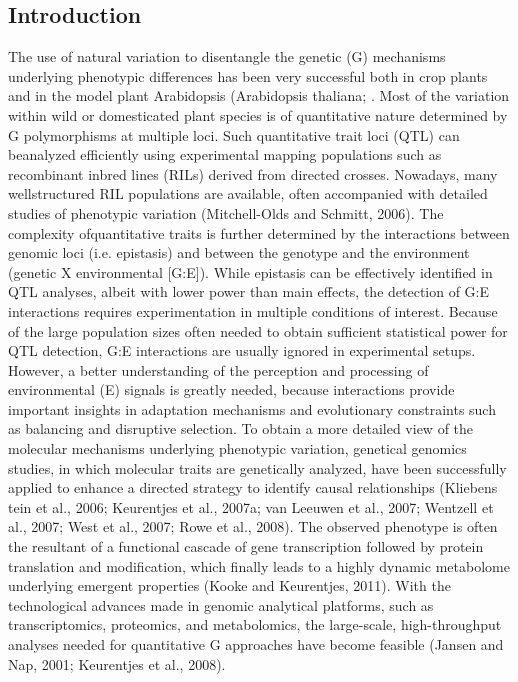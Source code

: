 \subsection{Introduction}
The use of natural variation to disentangle the genetic (G) mechanisms underlying phenotypic differences 
has been very successful both in crop plants and in the model plant Arabidopsis (Arabidopsis thaliana; 
\cite{Alonso-Blanco:2009}. Most of the variation within wild or domesticated plant species is of 
quantitative nature determined by G polymorphisms at multiple loci. Such quantitative trait loci (QTL) 
can beanalyzed efficiently using experimental mapping populations such as recombinant inbred lines (RILs)
derived from directed crosses. Nowadays, many wellstructured RIL populations are available, often 
accompanied with detailed studies of phenotypic variation (Mitchell-Olds and Schmitt, 2006). The complexity 
ofquantitative traits is further determined by the interactions between genomic loci (i.e. epistasis) and 
between the genotype and the environment (genetic X environmental [G:E]). While epistasis can be effectively
identified in QTL analyses, albeit with lower power than main effects, the detection of G:E interactions 
requires experimentation in multiple conditions of interest. Because of the large population sizes often 
needed to obtain sufficient statistical power for QTL detection, G:E interactions are usually ignored in 
experimental setups. However, a better understanding of the perception and processing of environmental (E)
signals is greatly needed, because interactions provide important insights in adaptation mechanisms and
evolutionary constraints such as balancing and disruptive selection. To obtain a more detailed view of the
molecular mechanisms underlying phenotypic variation, genetical genomics studies, in which molecular traits
are genetically analyzed, have been successfully applied to enhance a directed strategy to identify causal
relationships (Kliebens tein et al., 2006; Keurentjes et al., 2007a; van Leeuwen et al., 2007; 
Wentzell et al., 2007; West et al., 2007; Rowe et al., 2008). The observed phenotype is often the resultant 
of a functional cascade of gene transcription followed by protein translation and modification, which 
finally leads to a highly dynamic metabolome underlying emergent properties (Kooke and Keurentjes, 2011). 
With the technological advances made in genomic analytical platforms, such as transcriptomics, proteomics, 
and metabolomics, the large-scale, high-throughput analyses needed for quantitative G approaches have 
become feasible (Jansen and Nap, 2001; Keurentjes et al., 2008). 

